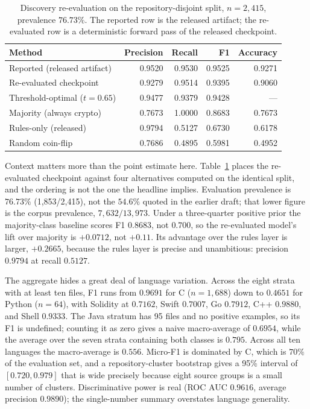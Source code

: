 \documentclass[journal,10pt]{IEEEtran}
\begin{document}
\begin{table}[t]
\centering
\caption{Discovery re-evaluation on the repository-disjoint split, $n=2{,}415$, prevalence
$76.73\%$. The reported row is the released artifact; the re-evaluated row is a deterministic
forward pass of the released checkpoint.}
\label{tab:discovery}
\footnotesize
\begin{tabular}{@{}>{\raggedright\arraybackslash}p{2.5cm}rrrr@{}}
\toprule
Method & Precision & Recall & F1 & Accuracy \\
\midrule
Reported (released artifact) & 0.9520 & 0.9530 & 0.9525 & 0.9271 \\
Re-evaluated checkpoint & 0.9279 & 0.9514 & 0.9395 & 0.9060 \\
Threshold-optimal ($t=0.65$) & 0.9477 & 0.9379 & 0.9428 & --- \\
Majority (always crypto) & 0.7673 & 1.0000 & 0.8683 & 0.7673 \\
Rules-only (released) & 0.9794 & 0.5127 & 0.6730 & 0.6178 \\
Random coin-flip & 0.7686 & 0.4895 & 0.5981 & 0.4952 \\
\bottomrule
\end{tabular}
\end{table}

Context matters more than the point estimate here. Table~\ref{tab:discovery} places the
re-evaluated checkpoint against four alternatives computed on the identical split, and the ordering
is not the one the headline implies. Evaluation prevalence is $76.73\%$
(1{,}853/2{,}415), not the $54.6\%$ quoted in the earlier draft; that lower figure is the corpus
prevalence, $7{,}632/13{,}973$. Under a three-quarter positive prior the majority-class baseline
scores F1 $0.8683$, not $0.700$, so the re-evaluated model's lift over majority is $+0.0712$, not
$+0.11$. Its advantage over the rules layer is larger, $+0.2665$, because the rules layer is
precise and unambitious: precision $0.9794$ at recall $0.5127$.

The aggregate hides a great deal of language variation. Across the eight strata with at least ten
files, F1 runs from $0.9691$ for C ($n=1{,}688$) down to $0.4651$ for Python ($n=64$), with
Solidity at $0.7162$, Swift $0.7007$, Go $0.7912$, C++ $0.9880$, and Shell $0.9333$. The Java
stratum has 95 files and no positive examples, so its F1 is undefined; counting it as zero gives a
naive macro-average of $0.6954$, while the average over the seven strata containing both classes is
$0.795$. Across all ten languages the macro-average is $0.556$. Micro-F1 is dominated by C, which is
$70\%$ of the evaluation set, and a repository-cluster bootstrap gives a 95\% interval of
$[0.720,0.979]$ that is wide precisely because eight source groups is a small number of clusters.
Discriminative power is real (ROC AUC $0.9616$, average precision $0.9890$); the single-number
summary overstates language generality.
\end{document}
